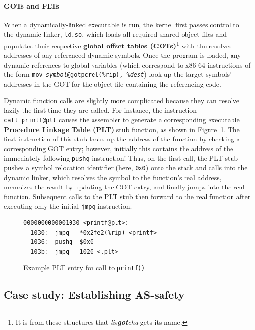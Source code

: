 \paragraph{GOTs and PLTs}

When a dynamically-linked executable is run, the kernel first passes control to the
dynamic linker, \texttt{ld.so}, which loads all required shared object files and
populates their respective \textbf{global offset tables (GOTs)}\footnote{It is from
these structures that \textit{lib\textbf{got}cha} gets its name.} with the resolved
addresses of any referenced dynamic symbols.  Once the program is loaded, any
dynamic references to global variables (which correspond to x86-64 instructions of
the form \texttt{mov~\textit{symbol}@gotpcrel(\%rip),~\%\textit{dest}}) look up the
target symbols' addresses in the GOT for the object file containing the referencing
code.

Dynamic function calls are slightly more complicated because they can resolve lazily
the first time they are called.  For instance, the instruction
\texttt{call~printf@plt} causes the assembler to generate a corresponding executable
\textbf{Procedure Linkage Table (PLT)} stub function, as shown in
Figure~\ref{fig:plt}.  The first instruction of this stub looks up the address of the
function by checking a corresponding GOT entry; however, initially this contains the
address of the immediately-following \texttt{pushq} instruction!  Thus, on the first
call, the PLT stub pushes a symbol relocation identifier (here, \texttt{0x0}) onto
the stack and calls into the dynamic linker, which resolves the symbol to the
function's real address, memoizes the result by updating the GOT entry, and finally
jumps into the real function.  Subsequent calls to the PLT stub then forward to the
real function after executing only the initial \texttt{jmpq} instruction.

\begin{figure}
\begin{verbatim}
0000000000001030 <printf@plt>:
  1030:  jmpq   *0x2fe2(%rip) <printf>
  1036:  pushq  $0x0
  103b:  jmpq   1020 <.plt>
\end{verbatim}
\caption{Example PLT entry for call to \texttt{printf()}}
\label{fig:plt}
\end{figure}

\subsection{Case study: Establishing AS-safety}
\label{sec:statefulness}

